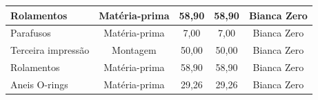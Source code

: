 \begin{landscape}
\begin{table}[htpb]
\begin{center}
\begin{tabular}{|l|c|c|c|c|}
Rolamentos & Matéria-prima & 58,90 & 58,90 & Bianca Zero \\ \hline

Parafusos & Matéria-prima & 7,00 & 7,00 & Bianca Zero \\ \hline

Terceira impressão & Montagem & 50,00 & 50,00 & Bianca Zero \\ \hline

Rolamentos & Matéria-prima & 58,90 & 58,90 & Bianca Zero \\ \hline

Aneis O-rings & Matéria-prima & 29,26 & 29,26 & Bianca Zero \\ \hline


\end{tabular}
\end{center}
\end{table}


\end{landscape}